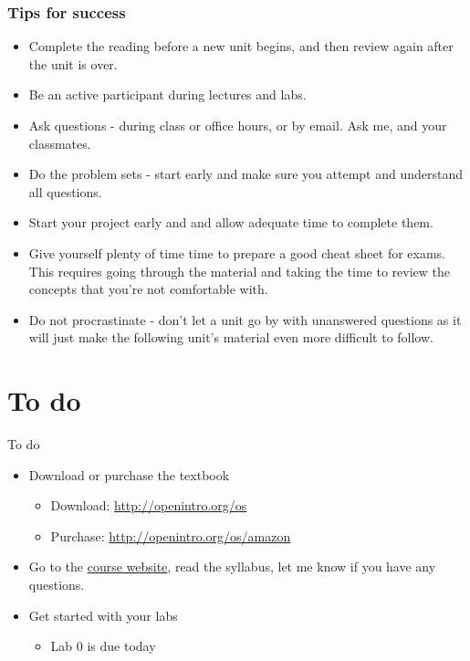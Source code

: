 \documentclass[11pt]{beamer}
\begin{document}
\begin{frame}
\frametitle{Tips for success}

{\footnotesize
\begin{itemize}[<alert@+>]
\item Complete the reading before a new unit begins, and then review again after the 
unit is over. \pause
\item Be an active participant during lectures and labs. \pause
\item Ask questions - during class or office hours, or by email. Ask me, and 
your classmates. \pause
\item Do the problem sets - start early and make sure you attempt and understand all 
questions. \pause

\item Start your project early and and allow adequate time to complete them. \pause
\item Give yourself plenty of time time to prepare a good cheat sheet for exams. This 
requires going through the material and taking the time to review the concepts that 
you're not comfortable with. \pause
\item Do not procrastinate - don't let a unit go by with unanswered questions as it 
will just make the following unit's material even more difficult to follow. 
\end{itemize}
}

\end{frame}



\section{To do}


\begin{frame}{To do}

\begin{itemize}

\item Download or purchase the textbook
\begin{itemize}
\item Download: \url{http://openintro.org/os}
\item Purchase: \url{http://openintro.org/os/amazon}
\end{itemize}

\item Go to the \alert{\href{https://garciarios.github.io/govt_3990/}{course website}}, read the syllabus, let me know if you have any questions.

\item Get started with your labs
\begin{itemize}
\item Lab 0 is due today
\end{itemize}

\end{itemize}

\end{frame}
\end{document}
